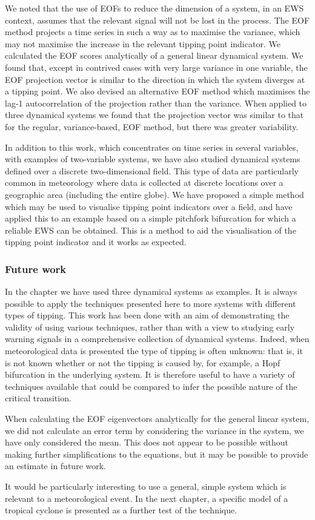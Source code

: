 We noted that the use of EOFs to reduce the dimension of a system, in an EWS context, assumes that the relevant signal will not be lost in the process. The EOF method projects a time series in such a way as to maximise the variance, which may not maximise the increase in the relevant tipping point indicator. We calculated the EOF scores analytically of a general linear dynamical system. We found that, except in contrived cases with very large variance in one variable, the EOF projection vector is similar to the direction in which the system diverges at a tipping point. We also devised an alternative EOF method which maximises the lag-1 autocorrelation of the projection rather than the variance. When applied to three dynamical systems we found that the projection vector was similar to that for the regular, variance-based, EOF method, but there was greater variability. 

In addition to this work, which concentrates on time series in several variables, with examples of two-variable systems, we have also studied dynamical systems defined over a discrete two-dimensional field. This type of data are particularly common in meteorology where data is collected at discrete locations over a geographic area (including the entire globe). We have proposed a simple method which may be used to visualise tipping point indicators over a field, and have applied this to an example based on a simple pitchfork bifurcation for which a reliable EWS can be obtained. This is a method to aid the visualisation of the tipping point indicator and it works as expected.

\subsubsection{Future work}

In the chapter we have used three dynamical systems as examples. It is always possible to apply the techniques presented here to more systems with different types of tipping. This work has been done with an aim of demonstrating the validity of using various techniques, rather than with a view to studying early warning signals in a comprehensive collection of dynamical systems. Indeed, when meteorological data is presented the type of tipping is often unknown: that is, it is not known whether or not the tipping is caused by, for example, a Hopf bifurcation in the underlying system. It is therefore useful to have a variety of techniques available that could be compared to infer the possible nature of the critical transition.

When calculating the EOF eigenvectors analytically for the general linear system, we did not calculate an error term by considering the variance in the system, we have only considered the mean. This does not appear to be possible without making further simplifications to the equations, but it may be possible to provide an estimate in future work.

It would be particularly interesting to use a general, simple system which is relevant to a meteorological event. In the next chapter, a specific model of a tropical cyclone is presented as a further test of the technique.


